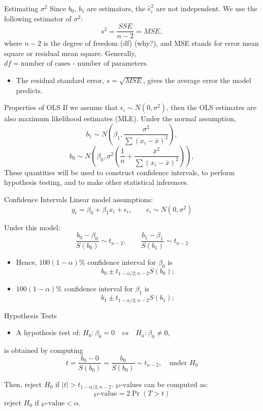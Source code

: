 \documentclass[
  ignorenonframetext,
]{beamer}
\providecommand{\tightlist}{%
  \setlength{\itemsep}{0pt}\setlength{\parskip}{0pt}}
\begin{document}
\begin{frame}{Estimating \(\sigma^2\)}
\label{estimating-sigma2-1}
Since \(b_0\), \(b_1\) are estimators, the \(\hat{e}_i^2\) are not
independent. We use the following estimator of \(\sigma^2\):
\[ s^2=\frac{SSE}{n-2}=MSE,\] where \(n-2\) is the degree of freedom
(df) (why?), and MSE stands for error mean square or residual mean
square. Generally, \(df=\text{number of cases - number of parameters}\).

\begin{itemize}
\tightlist
\item
  The residual standard error, \(s=\sqrt{MSE}\), gives the average error
  the model predicts.
\end{itemize}
\end{frame}

\begin{frame}{Properties of OLS}
\label{properties-of-ols}
If we assume that \(\epsilon_i \sim N(0, \sigma^2)\), then the OLS
estimates are also maximum likelihood estimates (MLE). Under the normal
assumption,
\[b_1\sim N\left(\beta_1 , \frac{\sigma^2}{\sum(x_i-\bar{x})^2}\right),\]
\[b_0\sim N\left(\beta_0 , \sigma^2\left(\frac{1}{n}+\frac{\bar{x}^2}{\sum(x_i-\bar{x})^2}\right)\right),\]
These quantities will be used to construct confidence intervals, to
perform hypothesis testing, and to make other statistical inferences.
\end{frame}

\begin{frame}{Confidence Intervals}
\label{confidence-intervals}
Linear model assumptions:
\[y_i=\beta_0+\beta_1 x_i+\epsilon_i, \quad \quad \epsilon_i \sim N(0, \sigma^2)\]

Under this model:
\[\frac{b_0-\beta_0}{S(b_0)}\sim t_{n-2}, \quad \quad \frac{b_1-\beta_1}{S(b_1)}\sim t_{n-2}\]

\begin{itemize}
\tightlist
\item
  Hence, \(100(1-\alpha)\%\) confidence interval for \(\beta_0\) is
  \[b_0\pm t_{1 -\alpha/2; n- 2}S(b_0);\]
\item
  \(100(1-\alpha)\%\) confidence interval for \(\beta_1\) is
  \[b_1\pm t_{1 - \alpha/2; n - 2}S(b_1);\]
\end{itemize}
\end{frame}

\begin{frame}{Hypothesis Tests}
\label{hypothesis-tests}
\begin{itemize}
\tightlist
\item
  A hypothesis test of:
  \(H_0: \beta_0=0\quad vs \quad H_a: \beta_0\neq 0\),
\end{itemize}

is obtained by computing
\[ t=\frac{b_0-0}{S(b_0)}=\frac{b_0}{S(b_0)}\sim t_{n-2}, \quad \text{under } H_0\]

Then, reject \(H_0\) if \(|t|>t_{1-\alpha/2, n-2}\).
\(\wp\text{-value}\)s can be computed as: \[\wp\text{-value}=2\Pr(T>t)\]
reject \(H_0\) if \(\wp\text{-value}<\alpha\).
\end{frame}
\end{document}

